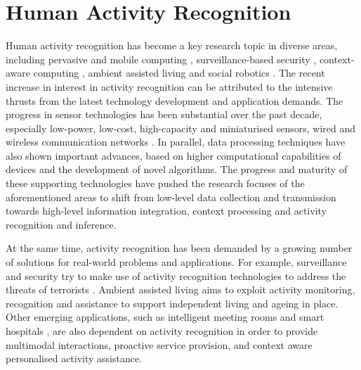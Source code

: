 \section{Human Activity Recognition}
\label{sec:soa:har}


Human activity recognition has become a key research topic in diverse areas, including pervasive and mobile computing \cite{Weiser1991} \cite{Choudhury2008}, surveillance-based security \cite{Poppe2010} \cite{Akdemir2008} \cite{Weinland2011}, context-aware computing \cite{Laerhoven2001} \cite{Wren2006}, ambient assisted living \cite{Philipose2004} \cite{Cook2009} \cite{Kasteren2008} \cite{Chen2012a} and social robotics \cite{Fong2003a}. The recent increase in interest in activity recognition can be attributed to the intensive thrusts from the latest technology development and application demands. The progress in sensor technologies has been substantial over the past decade, especially low-power, low-cost, high-capacity and miniaturised sensors, wired and wireless communication networks \cite{Pantelopoulos2010} \cite{Alemdar2010} \cite{Ding2011}. In parallel, data processing techniques have also shown important advances, based on higher computational capabilities of devices and the development of novel algorithms. The progress and maturity of these supporting technologies have pushed the research focuses of the aforementioned areas to shift from low-level data collection and transmission towards high-level information integration, context processing and activity recognition and inference. 

At the same time, activity recognition has been demanded by a growing number of solutions for real-world problems and applications. For example, surveillance and security try to make use of activity recognition technologies to address the threats of terrorists \cite{Akdemir2008}. Ambient assisted living aims to exploit activity monitoring, recognition and assistance to support independent living and ageing in place. Other emerging applications, such as intelligent meeting rooms \cite{Mikic2000} and smart hospitals \cite{Sanchez2008}, are also dependent on activity recognition in order to provide multimodal interactions, proactive service provision, and context aware personalised activity assistance. 

